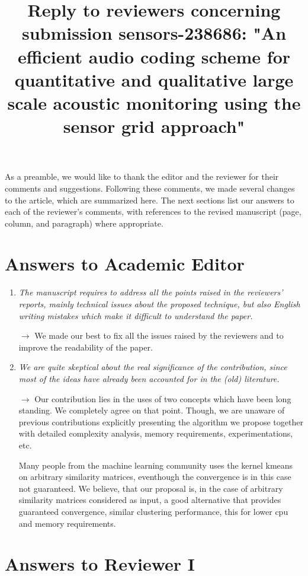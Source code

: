 \documentclass[10pt]{article}
\title{Reply to reviewers concerning submission sensors-238686: "An efficient audio coding scheme  for quantitative and qualitative large scale acoustic monitoring using the sensor grid approach"}
\begin{document}
\maketitle

As a preamble, we would like to thank the editor and the reviewer for their comments and suggestions. Following these comments, we made several changes to the article, which are summarized here. The next sections list our answers to each of the reviewer’s comments, with references to the revised manuscript (page, column, and paragraph) where appropriate.

\section{Answers to Academic Editor}

\begin{enumerate}

\item \emph{The manuscript requires to address all the points raised in the reviewers' reports, mainly technical issues about the proposed technique, but also English writing mistakes which make it difficult to understand the paper.}

$\rightarrow$ We made our best to fix all the issues raised by the reviewers and to improve the readability of the paper.


\item \emph{
We are quite skeptical about the real significance of the contribution, since most of the ideas have already been accounted for in the (old) literature.}

$\rightarrow$ Our contribution lies in the uses of two concepts which have been long standing. We completely agree on that point. Though, we are unaware of previous contributions explicitly presenting the algorithm we propose together with detailed complexity analysis, memory requirements, experimentations, etc.

Many people from the machine learning community uses the kernel kmeans on arbitrary similarity matrices, eventhough the convergence is in this case not guaranteed. We believe, that our proposal is, in the case of arbitrary similarity matrices considered as input, a good alternative that provides guaranteed convergence, similar clustering performance, this for lower cpu and memory requirements.

\end{enumerate}

\section{Answers to Reviewer I}
\end{document}
